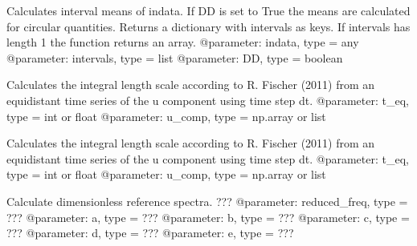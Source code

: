 \documentclass[letterpaper,10pt,english]{sphinxmanual}
\begin{document}

\begin{fulllineitems}
\label{\detokenize{index:windtunnel.calc_intervalmean}}
Calculates interval means of indata. If DD is set to True the means are 
calculated for circular quantities. Returns a dictionary with 
intervals as keys. If intervals has length 1 the function returns an array.
@parameter: indata, type = any
@parameter: intervals, type = list
@parameter: DD, type = boolean

\end{fulllineitems}


\begin{fulllineitems}
\label{\detokenize{index:windtunnel.calc_lux_data}}
Calculates the integral length scale according to R. Fischer (2011) 
from an equidistant time series of the u component using time step dt.
@parameter: t\_eq, type = int or float
@parameter: u\_comp, type = np.array or list

\end{fulllineitems}


\begin{fulllineitems}
\label{\detokenize{index:windtunnel.calc_lux_data_wght}}
Calculates the integral length scale according to R. Fischer (2011) 
from an equidistant time series of the u component using time step dt.
@parameter: t\_eq, type = int or float
@parameter: u\_comp, type = np.array or list

\end{fulllineitems}


\begin{fulllineitems}
\label{\detokenize{index:windtunnel.calc_ref_spectra}}
Calculate dimensionless reference spectra. ???
@parameter: reduced\_freq, type = ???
@parameter: a, type = ???
@parameter: b, type = ???
@parameter: c, type = ???
@parameter: d, type = ???
@parameter: e, type = ???

\end{fulllineitems}
\end{document}
